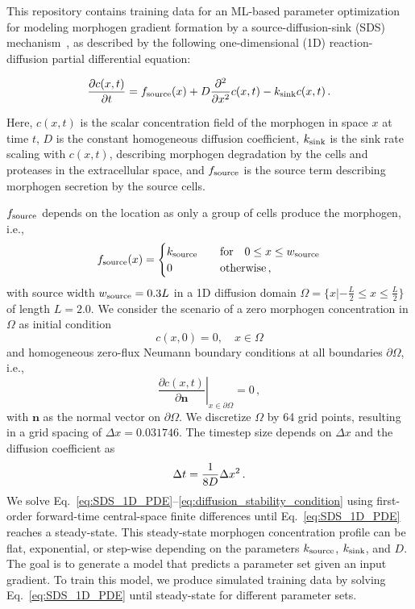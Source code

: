 \documentclass[11pt]{article}
\begin{document}
This repository contains training data for an ML-based parameter optimization for modeling morphogen gradient formation by a source-diffusion-sink (SDS) mechanism~\cite{Yu2009}, as described by the following one-dimensional (1D) reaction-diffusion partial differential equation:

\begin{equation}\label{eq:SDS_1D_PDE}
	\frac{\partial c(x,t)}{\partial t} = f_{\rm{source}}(x) + D\frac{\partial^2 }{\partial x^2}c(x,t) - k_{\rm{sink}}c(x,t)\,.
\end{equation}

Here, $c(x,t)$ is the scalar concentration field of the morphogen in space $x$ at time $t$, $D$ is the constant homogeneous diffusion coefficient, $k_{\rm{sink}}$ is the sink rate scaling with $c(x,t)$, describing morphogen degradation by the cells and proteases in the extracellular space, and $f_{\rm{source}}$ is the source term describing morphogen secretion by the source cells. 

$f_{\rm{source}}$ depends on the location as only a group of cells produce the morphogen, i.e.,
\begin{equation}\label{eq:source}
	f_{\rm{source}}(x) =
        \begin{cases}
        k_{\rm{source}} \quad & \text{for} \quad  0 \le x \le w_{\rm{source}}  \\
        0 & \rm{otherwise}\, ,
    \end{cases}  
\end{equation}
%
with source width $w_{\rm{source}} = 0.3 L$ in a 1D diffusion domain $\Omega = \{x | -\frac{L}{2} \leq x \leq \frac{L}{2}\} $ of length $L=2.0$. We consider the scenario of a zero morphogen concentration in $\Omega$ as initial condition
%
\begin{equation}\label{eq:IC}
	c(x,0) = 0, \quad x \in \Omega
\end{equation}
%
and homogeneous zero-flux Neumann boundary conditions at all boundaries $\partial \Omega$, i.e.,
%
\begin{equation}\label{eq:no_flux_BCs}
    \left. \frac{\partial c(x, t)}{\partial \bm n} \right\rvert_{x \in \partial \Omega} = 0\,,
\end{equation}
with $\bm n$ as the normal vector on $\partial \Omega$. We discretize $\Omega$ by 64 grid points, resulting in a grid spacing of $\Delta x=0.031746$. The timestep size depends on $\Delta x$ and the diffusion coefficient as
%
\begin{equation}{\label{eq:diffusion_stability_condition}}
    \Delta t = \frac{1}{8  D}  \Delta x^{2}\, .
\end{equation}
%
We solve Eq.~\eqref{eq:SDS_1D_PDE}--\eqref{eq:diffusion_stability_condition} using first-order forward-time central-space finite differences until Eq.~\eqref{eq:SDS_1D_PDE} reaches a steady-state. This steady-state morphogen concentration profile can be flat, exponential, or step-wise depending on the parameters $k_{\rm{source}}$, $k_{\rm{sink}}$, and $D$. The goal is to generate a model that predicts a parameter set given an input gradient. To train this model, we produce simulated training data by solving Eq.~\eqref{eq:SDS_1D_PDE} until steady-state for different parameter sets.
\end{document}
